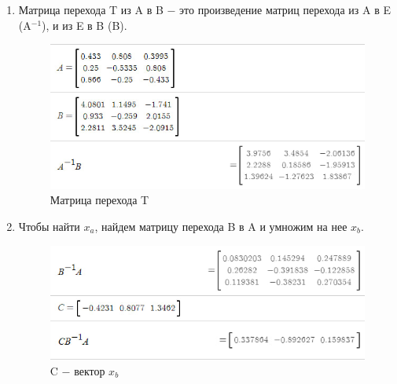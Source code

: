 \begin{enumerate}
    \item 
        Матрица перехода T из A в B $-$ это произведение матриц перехода из A в E (A$^{-1}$), и из E в B (B).\\
        \begin{figure}[H]
            \centering
            \includegraphics[width=0.6\linewidth]{2_ABT.png}
            \caption{Матрица перехода T}
        \end{figure}

    \item Чтобы найти $x_a$, найдем матрицу перехода B в A и умножим на нее $x_b$.\\
        \begin{figure}[H]
            \centering
            \includegraphics[width=0.6\linewidth]{2_xBAT.png}
            \caption{C $-$ вектор $x_b$}
        \end{figure}


\end{enumerate}
